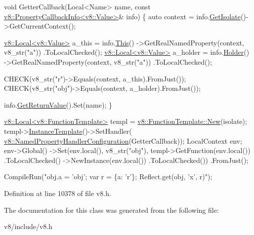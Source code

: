 \begin{DoxyCode}
\textcolor{keywordtype}{void} GetterCallback(Local<Name> name,
                    \textcolor{keyword}{const} \mbox{\hyperlink{classv8_1_1PropertyCallbackInfo}{v8::PropertyCallbackInfo<v8::Value>}}& info) \{
   \textcolor{keyword}{auto} context = info.\mbox{\hyperlink{classv8_1_1PropertyCallbackInfo_aff7b838ede308ab8a42890962eb9271c}{GetIsolate}}()->GetCurrentContext();

   \mbox{\hyperlink{classv8_1_1Local}{v8::Local<v8::Value>}} a\_this =
       info.\mbox{\hyperlink{classv8_1_1PropertyCallbackInfo_af46300339d2f31d8dc84a06d74ed6c3c}{This}}()
           ->GetRealNamedProperty(context, v8\_str(\textcolor{stringliteral}{"a"}))
           .ToLocalChecked();
   \mbox{\hyperlink{classv8_1_1Local}{v8::Local<v8::Value>}} a\_holder =
       info.\mbox{\hyperlink{classv8_1_1PropertyCallbackInfo_a66b7ec267f18bd84e8baf0a0e16187b9}{Holder}}()
           ->GetRealNamedProperty(context, v8\_str(\textcolor{stringliteral}{"a"}))
           .ToLocalChecked();

  CHECK(v8\_str(\textcolor{stringliteral}{"r"})->Equals(context, a\_this).FromJust());
  CHECK(v8\_str(\textcolor{stringliteral}{"obj"})->Equals(context, a\_holder).FromJust());

  info.\mbox{\hyperlink{classv8_1_1PropertyCallbackInfo_aa0882946929c3c4df6d131fe0d8d6746}{GetReturnValue}}().Set(name);
\}

\mbox{\hyperlink{classv8_1_1Local}{v8::Local<v8::FunctionTemplate>}} templ =
\mbox{\hyperlink{classv8_1_1FunctionTemplate_a55e3cc6d55e3cb089c49c7616fcb39f5}{v8::FunctionTemplate::New}}(isolate);
templ->\mbox{\hyperlink{classv8_1_1FunctionTemplate_acc7ec612c5eb38e5f76f75eaf1efd776}{InstanceTemplate}}()->SetHandler(
    \mbox{\hyperlink{structv8_1_1NamedPropertyHandlerConfiguration}{v8::NamedPropertyHandlerConfiguration}}(GetterCallback));
LocalContext env;
env->Global()
    ->Set(env.local(), v8\_str(\textcolor{stringliteral}{"obj"}), templ->GetFunction(env.local())
                                         .ToLocalChecked()
                                         ->NewInstance(env.local())
                                         .ToLocalChecked())
    .FromJust();

CompileRun(\textcolor{stringliteral}{"obj.a = 'obj'; var r = \{a: 'r'\}; Reflect.get(obj, 'x', r)"});
\end{DoxyCode}
 

Definition at line 10378 of file v8.\+h.



The documentation for this class was generated from the following file\+:\begin{DoxyCompactItemize}
\item 
v8/include/v8.\+h\end{DoxyCompactItemize}
